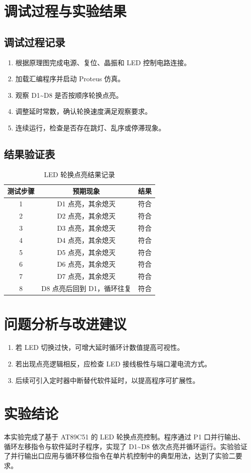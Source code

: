 \section{调试过程与实验结果}

\subsection{调试过程记录}
\begin{enumerate}
  \item 根据原理图完成电源、复位、晶振和 LED 控制电路连接。
  \item 加载汇编程序并启动 Proteus 仿真。
  \item 观察 D1\textasciitilde{}D8 是否按顺序轮换点亮。
  \item 调整延时常数，确认轮换速度满足观察要求。
  \item 连续运行，检查是否存在跳灯、乱序或停滞现象。
\end{enumerate}

\subsection{结果验证表}
\begin{table}[H]
  \centering
  \caption{LED 轮换点亮结果记录}
  \renewcommand{\arraystretch}{1.35}
  \begin{tabular}{ccc}
    \toprule
    测试步骤 & 预期现象 & 结果 \\
    \midrule
    1 & D1 点亮，其余熄灭 & 符合 \\
    2 & D2 点亮，其余熄灭 & 符合 \\
    3 & D3 点亮，其余熄灭 & 符合 \\
    4 & D4 点亮，其余熄灭 & 符合 \\
    5 & D5 点亮，其余熄灭 & 符合 \\
    6 & D6 点亮，其余熄灭 & 符合 \\
    7 & D7 点亮，其余熄灭 & 符合 \\
    8 & D8 点亮后回到 D1，循环往复 & 符合 \\
    \bottomrule
  \end{tabular}
\end{table}

\section{问题分析与改进建议}
\begin{enumerate}
  \item 若 LED 切换过快，可增大延时循环计数值提高可视性。
  \item 若出现点亮逻辑相反，应检查 LED 接线极性与端口灌电流方式。
  \item 后续可引入定时器中断替代软件延时，以提高程序可扩展性。
\end{enumerate}

\section{实验结论}
本实验完成了基于 AT89C51 的 LED 轮换点亮控制。程序通过 P1 口并行输出、循环左移指令与软件延时子程序，实现了 D1\textasciitilde{}D8 依次点亮并循环运行。实验验证了并行输出口应用与循环移位指令在单片机控制中的典型用法，达到了实验二要求。
